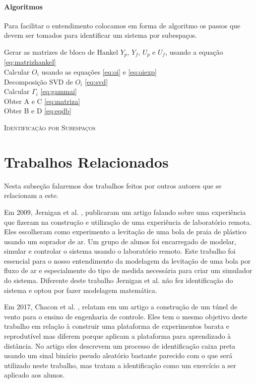 \paragraph{Algoritmos}\label{s:subalgoritmos}
Para facilitar o entendimento colocamos em forma de algoritmo os passos que devem ser tomados para identificar um sistema por subespaços.

\IncMargin{1em}
\begin{algorithm}[H]
	\nl Gerar as matrizes de bloco de Hankel $Y_p$, $Y_f$, $U_p$ e $U_f$, usando a equação \eqref{eq:matrizhankel}\\
	\nl Calcular $O_i$ usando as equações \eqref{eq:oi} e \eqref{eq:oiexp}\\
	\nl Decomposição SVD de $O_i$ \eqref{eq:svd}\\
	\nl Calcular $\Gamma_i$ \eqref{eq:gammai}\\
	\nl Obter A e C \eqref{eq:matriza}\\
	\nl Obter B e D \eqref{eq:eqdb}\\
	\label{alg:sub}
	\caption{\textsc{Identificação por Subespaços}}
	
\end{algorithm}
\DecMargin{1em}

\section{Trabalhos Relacionados}
Nesta subseção falaremos dos trabalhos feitos por outros autores que se relacionam a este.


Em 2009, Jernigan et al. \cite{jernigan2009}, publicaram um artigo falando sobre uma experiência que fizeram na construção e utilização de uma experiência de laboratório remota. Eles escolheram como experimento a levitação de uma bola de praia de plástico usando um soprador de ar. Um grupo de alunos foi encarregado de modelar, simular e controlar o sistema usando o laboratório remoto. Este trabalho foi essencial para o nosso entendimento da modelagem da levitação de uma bola por fluxo de ar e especialmente do tipo de medida necessária para criar um simulador do sistema. Diferente deste trabalho Jernigan et al. não fez identificação do sistema e optou por fazer modelagem matemática.


Em 2017, Chacon et al. \cite{chacon2017}, relatam em um artigo a construção de um túnel de vento para o ensino de engenharia de controle. Eles tem o mesmo objetivo deste trabalho em relação à construir uma plataforma de experimentos barata e reprodutível mas diferem porque aplicam a plataforma para aprendizado à distância. No artigo eles descrevem um processo de identificação caixa preta usando um sinal binário pseudo aleatório bastante parecido com o que será utilizado neste trabalho, mas tratam a identificação como um exercício a ser aplicado aos alunos.


